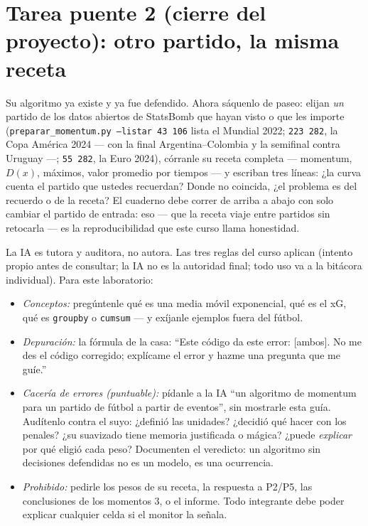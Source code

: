 \documentclass[12pt,letterpaper]{article}
\begin{document}
\section{Tarea puente 2 (cierre del proyecto): otro partido, la misma receta}
Su algoritmo ya existe y ya fue defendido. Ahora sáquenlo de paseo: elijan \emph{un} partido de los datos abiertos de StatsBomb que hayan visto o que les importe (\texttt{preparar\_momentum.py --listar 43 106} lista el Mundial 2022; \texttt{223 282}, la Copa América 2024 --- con la final Argentina--Colombia y la semifinal contra Uruguay ---; \texttt{55 282}, la Euro 2024), córranle su receta completa --- momentum, $D(x)$, máximos, valor promedio por tiempos --- y escriban tres líneas: ¿la curva cuenta el partido que ustedes recuerdan? Donde no coincida, ¿el problema es del recuerdo o de la receta? El cuaderno debe correr de arriba a abajo con solo cambiar el partido de entrada: eso --- que la receta viaje entre partidos sin retocarla --- es la reproducibilidad que este curso llama honestidad.

\begin{cajaia}
La IA es tutora y auditora, no autora. Las tres reglas del curso aplican (intento propio antes de consultar; la IA no es la autoridad final; todo uso va a la bitácora individual). Para este laboratorio:
\begin{itemize}[itemsep=0.15em]
    \item \emph{Conceptos:} pregúntenle qué es una media móvil exponencial, qué es el xG, qué es \texttt{groupby} o \texttt{cumsum} --- y exíjanle ejemplos fuera del fútbol.
    \item \emph{Depuración:} la fórmula de la casa: ``Este código da este error: [ambos]. No me des el código corregido; explícame el error y hazme una pregunta que me guíe.''
    \item \emph{Cacería de errores (puntuable):} pídanle a la IA ``un algoritmo de momentum para un partido de fútbol a partir de eventos'', sin mostrarle esta guía. Audítenlo contra el suyo: ¿definió las unidades? ¿decidió qué hacer con los penales? ¿su suavizado tiene memoria justificada o mágica? ¿puede \emph{explicar} por qué eligió cada peso? Documenten el veredicto: un algoritmo sin decisiones defendidas no es un modelo, es una ocurrencia.
    \item \emph{Prohibido:} pedirle los pesos de su receta, la respuesta a P2/P5, las conclusiones de los momentos 3, o el informe. Todo integrante debe poder explicar cualquier celda si el monitor la señala.
\end{itemize}
\end{cajaia}
\end{document}
